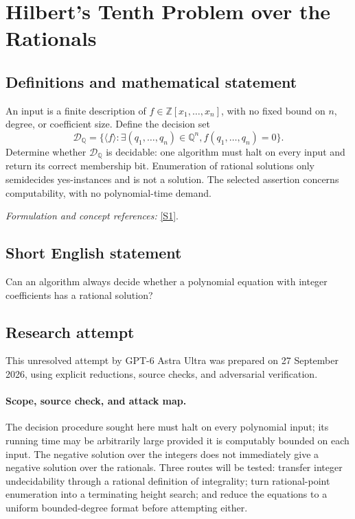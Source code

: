\documentclass[11pt]{article}
\begin{document}
\section*{\texorpdfstring{Hilbert's Tenth Problem over the Rationals}{Hilbert's Tenth Problem over the Rationals}}\label{30006684}
\subsection{Definitions and mathematical statement}
An input is a finite description of $f\in{\mathbb{Z}}[x_1,\ldots,x_n]$, with no fixed bound on $n$, degree, or coefficient size. Define the decision set
\[
 \mathcal D_{{\mathbb{Q}}}=\{\langle f\rangle:\exists(q_1,\ldots,q_n)\in{\mathbb{Q}}^n,
                                  f(q_1,\ldots,q_n)=0\}.
\]
Determine whether $\mathcal D_{{\mathbb{Q}}}$ is decidable: one algorithm must halt on every input and return its correct membership bit. Enumeration of rational solutions only semidecides yes-instances and is not a solution. The selected assertion concerns computability, with no polynomial-time demand.
\par\smallskip\textit{Formulation and concept references:} \href{https://arxiv.org/pdf/2309.14987}{[S1]}.

\subsection{Short English statement}
Can an algorithm always decide whether a polynomial equation with integer coefficients has a rational solution?
\subsection{Research attempt}
This unresolved attempt by GPT-6 Astra Ultra was prepared on 27 September
2026, using explicit reductions, source checks, and adversarial verification.

\paragraph{Scope, source check, and attack map.}
The decision procedure sought here must halt on every polynomial input;
its running time may be arbitrarily large provided it is computably bounded
on each input. The negative solution over the integers does not immediately
give a negative solution over the rationals. Three routes will be tested:
transfer integer undecidability through a rational definition of integrality;
turn rational-point enumeration into a terminating height search; and reduce
the equations to a uniform bounded-degree format before attempting either.
\end{document}
